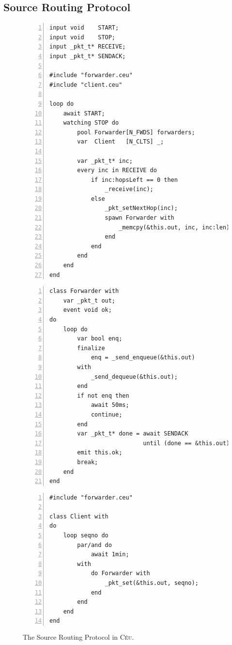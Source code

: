 \documentclass{sigplanconf}
\newcommand{\CEU}{\textsc{C\'{e}u}\xspace}
\newcommand{\1}{\;}
\newcommand{\2}{\;\;}
\newcommand{\3}{\;\;\;}
\newcommand{\5}{\;\;\;\;\;}
\begin{document}
\subsection{Source Routing Protocol}
\label{sec.apps.srp}

\begin{figure}%
\begin{minipage}[t]{0.50\linewidth}
\begin{lstlisting}[numbers=left,xleftmargin=3em,title=File "main.ceu"]
input void    START;
input void    STOP;
input _pkt_t* RECEIVE;
input _pkt_t* SENDACK;

#include "forwarder.ceu"
#include "client.ceu"

loop do
    await START;
    watching STOP do
        pool Forwarder[N_FWDS] forwarders;
        var  Client   [N_CLTS] _;

        var _pkt_t* inc;
        every inc in RECEIVE do
            if inc:hopsLeft == 0 then
                _receive(inc);
            else
                _pkt_setNextHop(inc);
                spawn Forwarder with
                    _memcpy(&this.out, inc, inc:len);
                end
            end
        end
    end
end
\end{lstlisting}
\end{minipage}
%
\begin{minipage}[t]{0.49\linewidth}
\begin{lstlisting}[numbers=left,xleftmargin=3em,title=File "forwarder.ceu"]
class Forwarder with
    var _pkt_t out;
    event void ok;
do
    loop do
        var bool enq;
        finalize
            enq = _send_enqueue(&this.out)
        with
            _send_dequeue(&this.out);
        end
        if not enq then
            await 50ms;
            continue;
        end
        var _pkt_t* done = await SENDACK
                           until (done == &this.out);
        emit this.ok;
        break;
    end
end
\end{lstlisting}
\begin{lstlisting}[numbers=left,xleftmargin=3em,title=File "client.ceu"]
#include "forwarder.ceu"

class Client with
do
    loop seqno do
        par/and do
            await 1min;
        with
            do Forwarder with
                _pkt_set(&this.out, seqno);
            end
        end
    end
end
\end{lstlisting}
\end{minipage}
%
\caption{ The Source Routing Protocol in \CEU.
\label{lst.apps.srp}
}
\end{figure}
%
\end{document}
